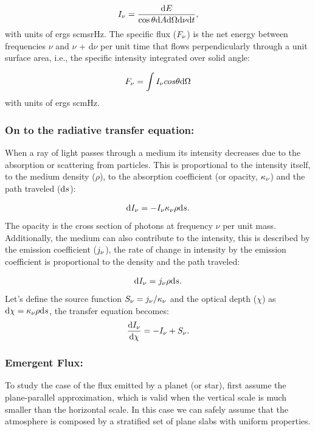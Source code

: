 \documentclass[letterpaper,12pt]{article}
\begin{document}
{\begin{equation}
I\sb{\nu} = \frac{\der E}{\cos\theta \der A \der\Omega \der\nu \der t},
\end{equation}
with units of ergs s\tno cm\tnt sr\tno Hz\tno.  The specific flux
($F\sb{\nu}$) is the net energy between frequencies $\nu$ and $\nu$ +
d$\nu$ per unit time that flows perpendicularly through a unit surface
area, i.e., the specific intensity integrated over solid angle:

\begin{equation}
F\sb{\nu} = \int I\sb{\nu} cos\theta \der\Omega
\end{equation}
with units of ergs s\tno cm\tnt Hz\tno.

\subsubsection{On to the radiative transfer equation:} 
When a ray of light passes
through a medium its intensity decreases due to the absorption or
scattering from particles. This is proportional to the intensity
itself, to the medium density ($\rho$), to the absorption coefficient
(or opacity, $\kappa\sb{\nu}$) and the path traveled (${\rm d} s$):

\begin{equation}
\der I\sb{\nu} = - I\sb{\nu} \kappa\sb{\nu} \rho \der s.
\end{equation}
The opacity is the cross section of photons at frequency $\nu$ per
unit mass.  Additionally, the medium can also contribute to the
intensity, this is described by the emission coefficient
($j\sb{\nu}$), the rate of change in intensity by the emission
coefficient is proportional to the density and the path traveled:

\begin{equation}
\der I\sb{\nu} =  j\sb{\nu} \rho \der s.
\end{equation}
Let's define the source function $S\sb{\nu} =
j\sb{\nu}/\kappa\sb{\nu}$ and the optical depth ($\chi$) as $\der
\chi = \kappa\sb{\nu} \rho \der s$, the transfer equation becomes:
\begin{equation}
\frac{\der I\sb{\nu}}{\der \chi} = - I\sb{\nu}  +  S\sb{\nu}.
\end{equation}

\subsubsection{Emergent Flux:} 

To study the case of the flux emitted by a planet (or star), first
assume the plane-parallel approximation, which is valid when the
vertical scale is much smaller than the horizontal scale.  In this
case we can safely assume that the atmosphere is composed by a
stratified set of plane slabs with uniform properties.

}
\end{document}

